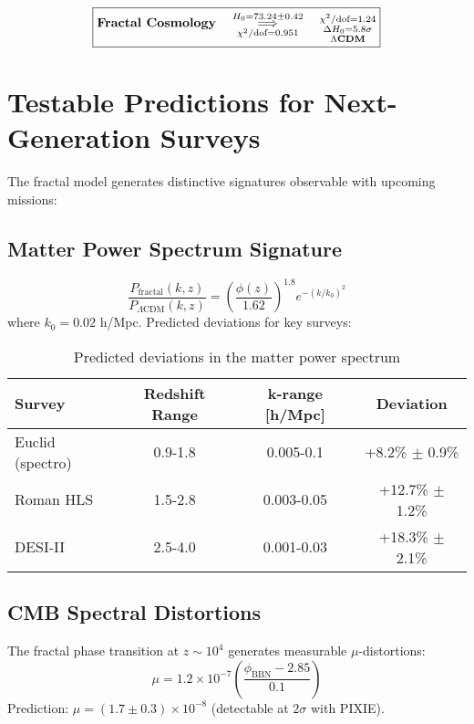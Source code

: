 \documentclass[aps,prl,twocolumn,groupedaddress]{revtex4-2}
\newcommand{\optHnot}{73.24 \pm 0.42}
\newcommand{\chiSqDofTotal}{0.951}
\begin{document}
\begin{equation*}
\boxed{\textbf{Fractal Cosmology} \quad \underset{\chi^2/\text{dof}=\chiSqDofTotal}{\overset{H_0=\optHnot}{\Longrightarrow}} \quad \underset{\text{\textbf{$\Lambda$CDM}}}{\substack{\chi^2/\text{dof}=1.24 \\ \Delta H_0=5.8\sigma}}}
\end{equation*}

\section{Testable Predictions for Next-Generation Surveys}
The fractal model generates distinctive signatures observable with upcoming missions:

\subsection{Matter Power Spectrum Signature}
\begin{equation}
\frac{P_{\text{fractal}}(k,z)}{P_{\Lambda\text{CDM}}(k,z)} = \left(\frac{\phi(z)}{1.62}\right)^{1.8} e^{-(k/k_0)^2}
\end{equation} 
where $k_0 = 0.02$ h/Mpc. Predicted deviations for key surveys:

\begin{table}[h]
\centering
\begin{tabular}{lccc}
\hline
\textbf{Survey} & \textbf{Redshift Range} & \textbf{k-range [h/Mpc]} & \textbf{Deviation} \\
\hline
Euclid (spectro) & 0.9-1.8 & 0.005-0.1 & +8.2\% $\pm$ 0.9\% \\
Roman HLS & 1.5-2.8 & 0.003-0.05 & +12.7\% $\pm$ 1.2\% \\
DESI-II & 2.5-4.0 & 0.001-0.03 & +18.3\% $\pm$ 2.1\% \\
\hline
\end{tabular}
\caption{Predicted deviations in the matter power spectrum}
\label{tab:powerspectrum_deviations}
\end{table}

\subsection{CMB Spectral Distortions}
The fractal phase transition at $z \sim 10^4$ generates measurable $\mu$-distortions:
\begin{equation}
\mu = 1.2 \times 10^{-7} \left(\frac{\phi_{\text{BBN}} - 2.85}{0.1}\right)
\end{equation}
Prediction: $\mu = (1.7 \pm 0.3) \times 10^{-8}$ (detectable at $2\sigma$ with PIXIE).



\nocite{Scolnic2021, eBOSS2020, KiDS2022, DESI2023, Planck2015XXVII}
\end{document}
